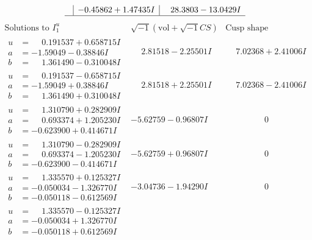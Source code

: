 \documentclass[1p]{elsarticle_modified}
\theoremstyle{definition}
\newcommand{\I}{\sqrt{-1}}
\begin{document}
$$\begin{array}{c|c|c}
 & -0.45862 + 1.47435 I & \phantom{-}28.3803 - 13.0429 I\\
 \hline 
 \end{array}$$\newpage$$\begin{array}{c|c|c}  
\text{Solutions to }I^u_{1}& \I (\text{vol} + \sqrt{-1}CS) & \text{Cusp shape}\\
 \hline 
\begin{aligned}
u &= \phantom{-}0.191537 + 0.658715 I \\
a &= -1.59049 - 0.38846 I \\
b &= \phantom{-}1.361490 - 0.310048 I\end{aligned}
 & \phantom{-}2.81518 - 2.25501 I & \phantom{-}7.02368 + 2.41006 I \\ \hline\begin{aligned}
u &= \phantom{-}0.191537 - 0.658715 I \\
a &= -1.59049 + 0.38846 I \\
b &= \phantom{-}1.361490 + 0.310048 I\end{aligned}
 & \phantom{-}2.81518 + 2.25501 I & \phantom{-}7.02368 - 2.41006 I \\ \hline\begin{aligned}
u &= \phantom{-}1.310790 + 0.282909 I \\
a &= \phantom{-}0.693374 + 1.205230 I \\
b &= -0.623900 + 0.414671 I\end{aligned}
 & -5.62759 - 0.96807 I & \phantom{-0.000000 } 0 \\ \hline\begin{aligned}
u &= \phantom{-}1.310790 - 0.282909 I \\
a &= \phantom{-}0.693374 - 1.205230 I \\
b &= -0.623900 - 0.414671 I\end{aligned}
 & -5.62759 + 0.96807 I & \phantom{-0.000000 } 0 \\ \hline\begin{aligned}
u &= \phantom{-}1.335570 + 0.125327 I \\
a &= -0.050034 - 1.326770 I \\
b &= -0.050118 - 0.612569 I\end{aligned}
 & -3.04736 - 1.94290 I & \phantom{-0.000000 } 0 \\ \hline\begin{aligned}
u &= \phantom{-}1.335570 - 0.125327 I \\
a &= -0.050034 + 1.326770 I \\
b &= -0.050118 + 0.612569 I\end{aligned}

\end{array}$$
\end{document}
